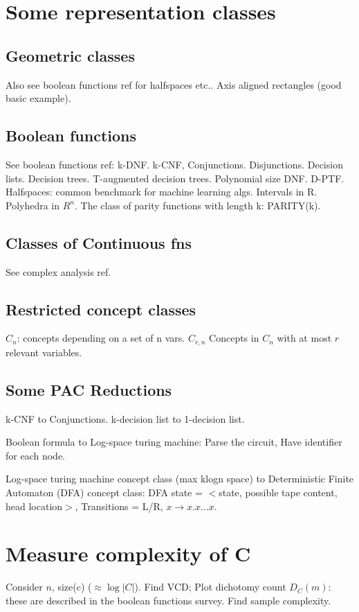 \documentclass[oneside, article]{memoir}
\begin{document}
\section{Some representation classes}
\subsection{Geometric classes}
Also see boolean functions ref for halfspaces etc.. Axis aligned rectangles (good basic example).

\subsection{Boolean functions}
See boolean functions ref: k-DNF. k-CNF, Conjunctions. Disjunctions. Decision lists. Decision trees. T-augmented decision trees. Polynomial size DNF. D-PTF. Halfspaces: common benchmark for machine learning algs. Intervals in R. Polyhedra in $R^{n}$. The class of parity functions with length k: PARITY(k).

\subsection{Classes of Continuous fns}
See complex analysis ref.

\subsection{Restricted concept classes}
$C_n$: concepts depending on a set of n vars. $C_{r,n}$ Concepts in $C_n$ with at most $r$ relevant variables.

\subsection{Some PAC Reductions}
k-CNF to Conjunctions. k-decision list to 1-decision list.

Boolean formula to Log-space turing machine: Parse the circuit, Have identifier for each node.

Log-space turing machine concept class (max klogn space) to Deterministic Finite Automaton (DFA) concept class: DFA state = $<$state, possible tape content, head location$>$, Transitions = L/R, $x \to x.x...x$.

\section{Measure complexity of C}
Consider $n$, size(c) ($\approx \log |C|$). Find VCD; Plot dichotomy count $D_{C}(m)$: these are described in the boolean functions survey. Find sample complexity.
\end{document}

